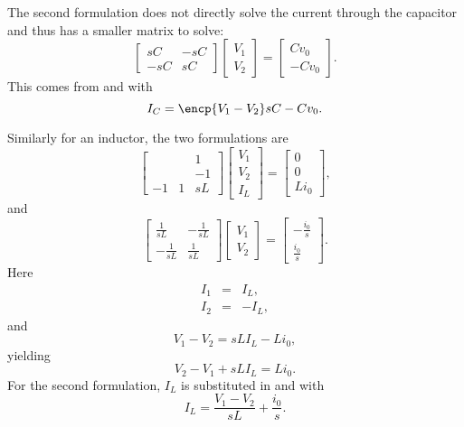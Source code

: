 \documentclass[a4paper, 12pt]{article}
\begin{document}
The second formulation does not directly solve the current through the
capacitor and thus has a smaller matrix to solve:
%
\begin{equation}
  \begin{bmatrix}
    sC & -sC \\
   -sC & sC
  \end{bmatrix}
  \begin{bmatrix}
    V_1 \\ V_2
  \end{bmatrix}
=
\begin{bmatrix}
  C v_0 \\ -C v_0
\end{bmatrix}.
\end{equation}
%
This comes from  and  with 
%
\begin{equation}
    I_C  =  \encp{V_1 - V_2}sC - C v_0.
\end{equation}

Similarly for an inductor, the two formulations are
%
\begin{equation}
  \begin{bmatrix}
     &  & 1 \\
     &  & -1 \\
-1 & 1 & sL
  \end{bmatrix}
  \begin{bmatrix}
    V_1 \\ V_2 \\ I_L
  \end{bmatrix}
=
\begin{bmatrix}
  0 \\ 0 \\ L i_0
\end{bmatrix},
\end{equation}
%
and
%
\begin{equation}
  \begin{bmatrix}
    \frac{1}{sL} & -\frac{1}{sL} \\
   -\frac{1}{sL} & \frac{1}{sL}
  \end{bmatrix}
  \begin{bmatrix}
    V_1 \\ V_2
  \end{bmatrix}
=
\begin{bmatrix}
  -\frac{i_0}{s} \\ \frac{i_0}{s}
\end{bmatrix}.
\end{equation}
%
Here
%
\begin{eqnarray}
\label{eqn:L_I1}
  I_1 & = & I_L, \\
  I_2 & = & -I_L,
\label{eqn:L_I2}
\end{eqnarray}
%
and
%
\begin{equation}
 V_1 - V_2 = s L I_L - L i_0, 
\end{equation}
%
yielding
%
\begin{equation}
  V_2 - V_1 + s L I_L = L i_0.
\end{equation}
%
For the second formulation, $I_L$ is substituted in  and
 with
%
\begin{equation}
  I_L = \frac{V_1 - V_2}{sL} + \frac{i_0}{s}.
\end{equation}
\end{document}
